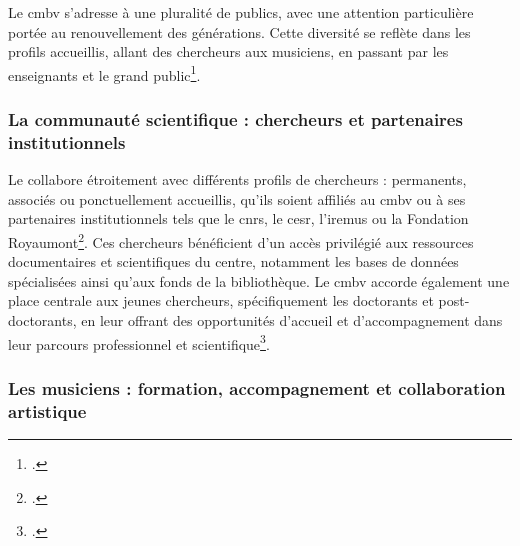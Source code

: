 Le \gls{cmbv} s’adresse à une pluralité de publics, avec une attention particulière portée au renouvellement des générations. Cette diversité se reflète dans les profils accueillis, allant des chercheurs aux musiciens, en passant par les enseignants et le grand public\footcite{centredemusiquebaroquedeversaillesProjetEtablissement2022}.

\subsubsection{La communauté scientifique : chercheurs et partenaires institutionnels}

Le  collabore étroitement avec différents profils de chercheurs : permanents, associés ou ponctuellement accueillis, qu’ils soient affiliés au \gls{cmbv} ou à ses partenaires institutionnels tels que le \gls{cnrs}, le \gls{cesr}, l’\gls{iremus} ou la Fondation Royaumont\footcite{CentreMusiqueBaroque}. Ces chercheurs bénéficient d’un accès privilégié aux ressources documentaires et scientifiques du centre, notamment les bases de données spécialisées ainsi qu’aux fonds de la bibliothèque. Le \gls{cmbv} accorde également une place centrale aux jeunes chercheurs, spécifiquement les doctorants et post-doctorants, en leur offrant des opportunités d’accueil et d’accompagnement dans leur parcours professionnel et scientifique\footcite{centredemusiquebaroquedeversaillesProjetEtablissement2022}.

\subsubsection{Les musiciens : formation, accompagnement et collaboration artistique}

